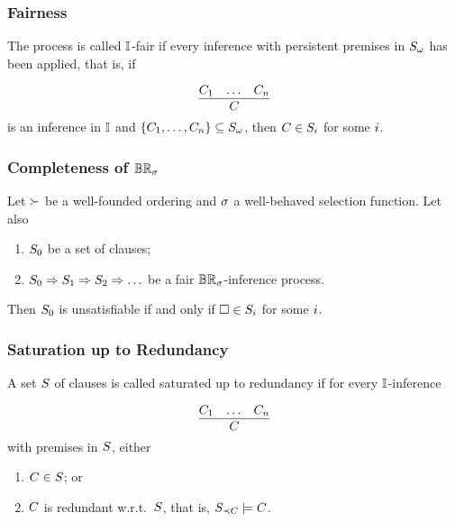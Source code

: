                             \begin{frame}\frametitle{Fairness}

The process is called \alert{$\mathbb{I}$-fair} if every inference with persistent
premises in ${S_\omega}$ has been applied, that is, if 

    \[\M{
      \infer{C}{C_1 & \ldots & C_n}}
    \]
is an inference in ${\mathbb{I}}$ 
and ${{\{{C_{1},\ldots,C_{n}}\}} \subseteq S_\omega}$,
then ${C \in S_i}$ for some ${i}$.


                                \end{frame}


                    \begin{frame}\frametitle{Completeness of $\mathbb{BR}_{\sigma}$}


\textbf{}
Let ${\succ}$ be a well-founded ordering and ${\sigma}$ a
well-behaved selection function. Let also 

\begin{enumerate}
\item ${S_0}$ be a set of clauses;
\item ${S_0 \Rightarrow S_1 \Rightarrow S_2 \Rightarrow \ldots}$ be a fair 
${\mathbb{BR}_{\sigma}}$-inference process.
\end{enumerate}
Then ${S_0}$ is unsatisfiable if and only if ${\Box \in S_i}$
for some ${i}$.

                                \end{frame}



                      \begin{frame}\frametitle{Saturation up to Redundancy}

A set ${S}$ of clauses is called \alert{saturated up to redundancy} if
for every ${\mathbb{I}}$-inference 

    \[\M{
      \infer{C}{C_1 & \ldots & C_n}}
    \]
with premises in ${S}$, either

\begin{enumerate}
\item ${C \in S}$; or
\item ${C}$ is redundant w.r.t.\ ${S}$, that is, 
${S_{\prec C} \models C}$.
\end{enumerate}

                                \end{frame}

